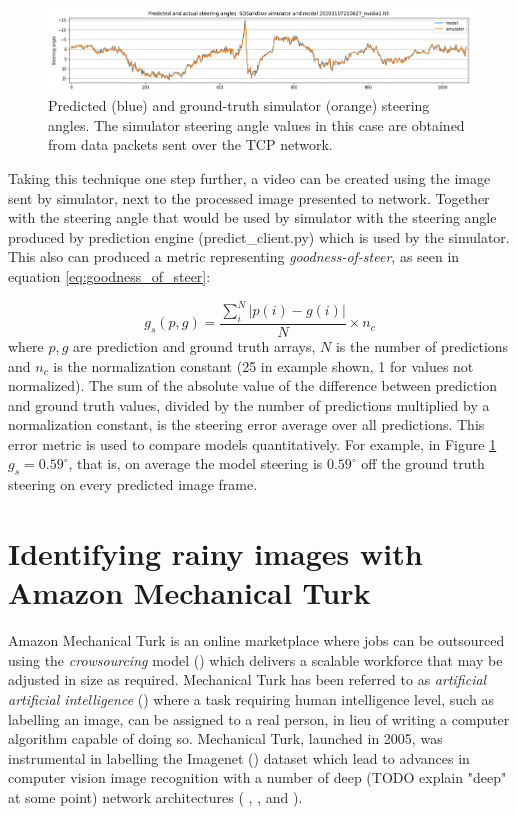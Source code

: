 \begin{figure}[ht]
 \centering 
 \includegraphics[width=\textwidth]{Figures/PredSteeringAnglestcpflowNvidia1.png}
 \caption{Predicted (blue) and ground-truth simulator (orange) steering angles. The simulator steering angle values in this case are obtained from data packets sent over the TCP network.}
 \label{fig:PredSteeringAnglestcpflowNvidia1}
\end{figure}

Taking this technique one step further, a video can be created using the image sent by simulator, next to the processed image presented to network. Together with the steering angle that would be used by simulator with the steering angle produced by prediction engine (predict\_client.py) which is used by the simulator.
This also can produced a metric representing \textit{goodness-of-steer}, as seen in equation     \ref{eq:goodness_of_steer}:

\begin{equation}
    \label{eq:goodness_of_steer}
    g_s(p,g) = \frac{\sum_i^N \lvert p(i)-g(i) \rvert }{N} \times n_c
\end{equation}
where $p,g$ are prediction and ground truth arrays,  $N$ is the number of predictions and $n_c$ is the normalization constant (25 in example shown, 1 for values not normalized). The sum of the absolute value of the difference between prediction and ground truth values, divided by the number of predictions multiplied by a normalization constant, is the steering error average over all predictions. This error metric is used to compare models quantitatively. For example, in Figure \ref{fig:PredSteeringAnglestcpflowNvidia1} $g_s = 0.59^{\circ}$, that is, on average the model steering is $0.59^{\circ}$ off the ground truth steering on every predicted image frame. 

\section{Identifying rainy images with Amazon Mechanical Turk}

Amazon Mechanical Turk \cite{crowston2012amazon} is an online marketplace where jobs can be outsourced using the \textit{crowsourcing} model  (\cite{vukovic2009crowdsourcing}) which delivers a scalable workforce that may be adjusted in size as required. Mechanical Turk has been referred to as \textit{artificial artificial intelligence} (\cite{dai2011artificial}) where a task requiring human intelligence level, such as labelling an image, can be assigned to a real person, in lieu of writing  a computer algorithm capable of doing so. Mechanical Turk, launched in 2005, was instrumental in labelling the Imagenet (\cite{deng2009imagenet}) dataset which lead to advances in computer vision image recognition with a number of deep (TODO explain "deep" at some point) network architectures ( \cite{krizhevsky2012imagenet}, \cite{he2015deep}, \cite{szegedy2014going} and \cite{simonyan2015deep}). 

